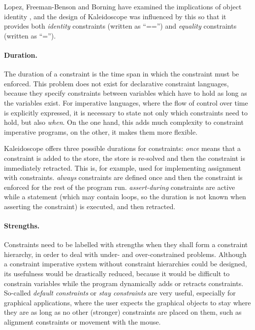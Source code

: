 Lopez, Freeman-Benson and Borning have examined the implications of
object identity \cite{lopez94identity}, and the design of
Kaleidoscope was influenced by this so that it provides both {\em
  identity} constraints (written as ``=='') and {\em equality}
constraints (written as ``='').

\paragraph{Duration.}  

The duration of a constraint is the time span in which the constraint
must be enforced.  This problem does not exist for declarative
constraint languages, because they specify constraints between
variables which have to hold as long as the variables exist.  For
imperative languages, where the flow of control over time is
explicitly expressed, it is necessary to state not only which
constraints need to hold, but also {\em when}.  On the one hand, this
adds much complexity to constraint imperative programs, on the other,
it makes them more flexible.

Kaleidoscope offers three possible durations for constraints: {\em
  once} means that a constraint is added to the store, the store is
re-solved and then the constraint is immediately retracted.  This is,
for example, used for implementing assignment with constraints.  {\em
  always} constraints are defined once and then the constraint is
enforced for the rest of the program run.  {\em assert-during}
constraints are active while a statement (which may contain loops, so
the duration is not known when asserting the constraint) is executed,
and then retracted.



\paragraph{Strengths.}
%
Constraints need to be labelled with strengths when they shall form a
constraint hierarchy, in order to deal with under- and
over-constrained problems.  Although a constraint imperative system
without constraint hierarchies could be designed, its usefulness would
be drastically reduced, because it would be difficult to constrain
variables while the program dynamically adds or retracts constraints.
So-called {\em default constraints} or {\em stay constraints}
\cite{borning2000splitstay} are very useful, especially for graphical
applications, where the user expects the graphical objects to stay
where they are as long as no other (stronger) constraints are placed
on them, such as alignment constraints or movement with the mouse.

